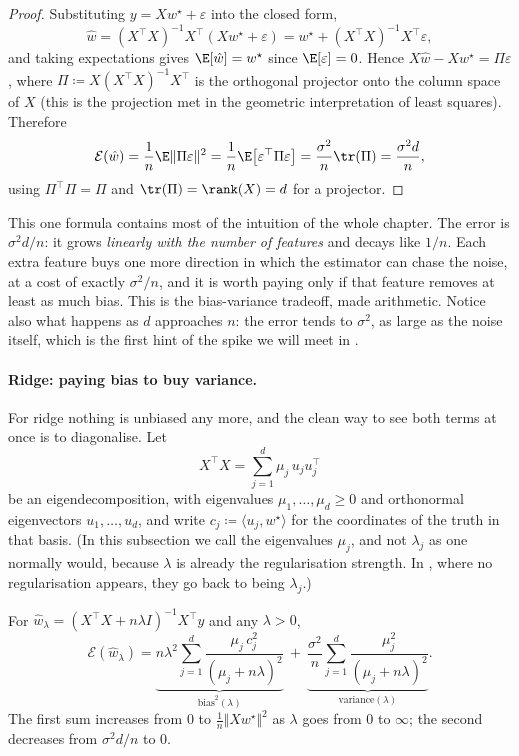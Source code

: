 \begin{proof}
Substituting $y = X w^\star + \varepsilon$ into the closed form,
\[
\hat w = (X^\top X)^{-1} X^\top (X w^\star + \varepsilon)
= w^\star + (X^\top X)^{-1} X^\top \varepsilon ,
\]
and taking expectations gives $\E[\hat w] = w^\star$ since $\E[\varepsilon] = 0$.
Hence $X\hat w - X w^\star = \Pi \varepsilon$, where $\Pi \coloneqq X (X^\top X)^{-1}
X^\top$ is the orthogonal projector onto the column space of $X$ (this is the
projection met in the geometric interpretation of least squares). Therefore
\[
\mathcal{E}(\hat w) = \frac1n \E \Vert \Pi \varepsilon \Vert^2
= \frac1n \E\big[ \varepsilon^\top \Pi \varepsilon \big]
= \frac{\sigma^2}{n} \tr(\Pi) = \frac{\sigma^2 d}{n} ,
\]
using $\Pi^\top \Pi = \Pi$ and $\tr(\Pi) = \rank(X) = d$ for a projector.
\end{proof}

This one formula contains most of the intuition of the whole chapter. The error is
$\sigma^2 d / n$: it grows \emph{linearly with the number of features} and decays like
$1/n$. Each extra feature buys one more direction in which the estimator can chase the
noise, at a cost of exactly $\sigma^2/n$, and it is worth paying only if that feature
removes at least as much bias. This is the bias-variance tradeoff, made arithmetic.
Notice also what happens as $d$ approaches $n$: the error tends to $\sigma^2$, as large
as the noise itself, which is the first hint of the spike we will meet in
.

\paragraph{Ridge: paying bias to buy variance.}
For ridge nothing is unbiased any more, and the clean way to see both terms at once is
to diagonalise. Let
\[
X^\top X = \sum_{j=1}^d \mu_j\, u_j u_j^\top
\]
be an eigendecomposition, with eigenvalues $\mu_1, \dots, \mu_d \geq 0$ and
orthonormal eigenvectors $u_1, \dots, u_d$, and write $c_j \coloneqq \langle u_j,
w^\star \rangle$ for the coordinates of the truth in that basis. (In this subsection we
call the eigenvalues $\mu_j$, and not $\lambda_j$ as one normally would, because
$\lambda$ is already the regularisation strength. In , where no
regularisation appears, they go back to being $\lambda_j$.)

\begin{prop}
\label{prop:bv-ridge}
For $\hat w_\lambda = (X^\top X + n\lambda I)^{-1} X^\top y$ and any $\lambda > 0$,
\[
\mathcal{E}(\hat w_\lambda)
= \underbrace{n \lambda^2 \sum_{j=1}^d \frac{\mu_j\, c_j^2}{(\mu_j + n\lambda)^2}}_{\mathrm{bias}^2(\lambda)}
\ + \ \underbrace{\frac{\sigma^2}{n} \sum_{j=1}^d \frac{\mu_j^2}{(\mu_j + n\lambda)^2}}_{\mathrm{variance}(\lambda)} .
\]
The first sum increases from $0$ to $\tfrac1n \Vert X w^\star\Vert^2$ as $\lambda$ goes
from $0$ to $\infty$; the second decreases from $\sigma^2 d / n$ to $0$.
\end{prop}

